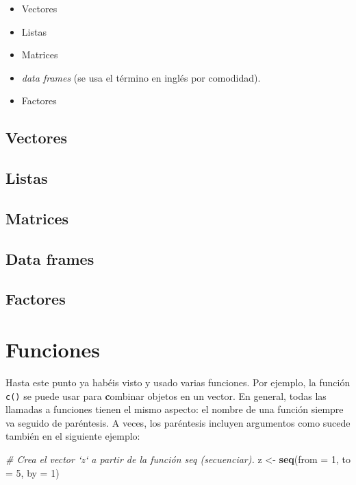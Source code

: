 \documentclass[
]{book}
\newenvironment{Shaded}{\begin{snugshade}}{\end{snugshade}}
\newcommand{\CommentTok}[1]{\textcolor[rgb]{0.56,0.35,0.01}{\textit{#1}}}
\newcommand{\DataTypeTok}[1]{\textcolor[rgb]{0.13,0.29,0.53}{#1}}
\newcommand{\DecValTok}[1]{\textcolor[rgb]{0.00,0.00,0.81}{#1}}
\newcommand{\KeywordTok}[1]{\textcolor[rgb]{0.13,0.29,0.53}{\textbf{#1}}}
\newcommand{\NormalTok}[1]{#1}
\newcommand{\StringTok}[1]{\textcolor[rgb]{0.31,0.60,0.02}{#1}}
\providecommand{\tightlist}{%
  \setlength{\itemsep}{0pt}\setlength{\parskip}{0pt}}
\begin{document}
\begin{itemize}
\tightlist
\item
  Vectores
\item
  Listas
\item
  Matrices
\item
  \emph{data frames} (se usa el término en inglés por comodidad).
\item
  Factores
\end{itemize}

\hypertarget{vectores}{%
\subsection{Vectores}\label{vectores}}

\hypertarget{listas}{%
\subsection{Listas}\label{listas}}

\hypertarget{matrices}{%
\subsection{Matrices}\label{matrices}}

\hypertarget{data-frames}{%
\subsection{Data frames}\label{data-frames}}

\hypertarget{factores}{%
\subsection{Factores}\label{factores}}

\hypertarget{funciones}{%
\section{Funciones}\label{funciones}}

Hasta este punto ya habéis visto y usado varias funciones. Por ejemplo, la función \texttt{c()} se puede usar para \textbf{c}ombinar objetos en un vector. En general, todas las llamadas a funciones tienen el mismo aspecto: el nombre de una función siempre va seguido de paréntesis. A veces, los paréntesis incluyen argumentos como sucede también en el siguiente ejemplo:

\begin{Shaded}
\begin{Highlighting}[]
\CommentTok{# Crea el vector `z` a partir de la función seq (secuenciar).}
\NormalTok{z <-}\StringTok{ }\KeywordTok{seq}\NormalTok{(}\DataTypeTok{from =} \DecValTok{1}\NormalTok{, }\DataTypeTok{to =} \DecValTok{5}\NormalTok{, }\DataTypeTok{by =} \DecValTok{1}\NormalTok{)}
\end{Highlighting}
\end{Shaded}
\end{document}
